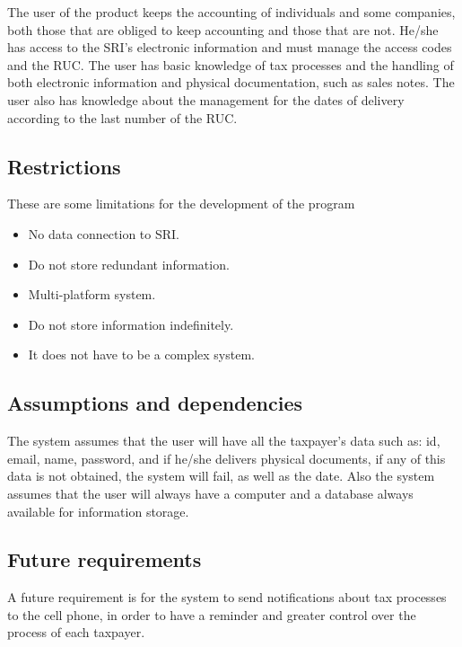 \documentclass[12pt,a4paper, twosite]{article}
\begin{document}
The user of the product keeps the accounting of individuals and some companies, both those that are obliged to keep accounting and those that are not. He/she has access to the SRI's electronic information and must manage the access codes and the RUC. The user has basic knowledge of tax processes and the handling of both electronic information and physical documentation, such as sales notes. The user also has knowledge about the management for the dates of delivery according to the last number of the RUC. 


\subsection{Restrictions}
\label{sec:org5ca5790}

These are some limitations for the development of the program

\begin{itemize}
\item No data connection to SRI.

\item Do not store redundant information.

\item Multi-platform system.

\item Do not store information indefinitely.

\item It does not have to be a complex system.


\end{itemize}


\subsection{Assumptions and dependencies}
\label{sec:org0ae23fe}

The system assumes that the user will have all the taxpayer's data such as: id, email, name, password, and if he/she delivers physical documents, if any of this data is not obtained, the system will fail, as well as the date. Also the system assumes that the user will always have a computer and a database always available for information storage.


\subsection{Future requirements}
\label{sec:org33cfcdb}

A future requirement is for the system to send notifications about tax processes to the cell phone, in order to have a reminder and greater control over the process of each taxpayer.   
\end{document}
